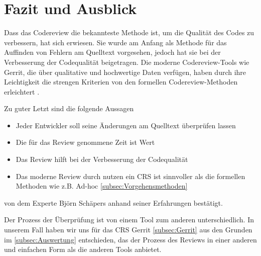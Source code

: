 \section{Fazit und Ausblick}

Dass das Codereview die bekannteste Methode ist, um die Qualität des Codes zu verbessern, hat sich erwiesen. Sie wurde am Anfang als Methode für das Auffinden von Fehlern am Quelltext vorgesehen, jedoch hat sie bei der Verbesserung der Codequalität beigetragen. Die moderne Codereview-Tools wie Gerrit, die über qualitative und hochwertige Daten verfügen, haben durch ihre Leichtigkeit die strengen Kriterien von den formellen Codereview-Methoden erleichtert \cite{mcintosh2016empirical}.

Zu guter Letzt sind die folgende Aussagen 

\begin{itemize}
	\item Jeder Entwickler soll seine Änderungen am Quelltext überprüfen lassen
	\item Die für das Review genommene Zeit ist Wert
	\item Das Review hilft bei der Verbesserung der Codequalität
	\item Das moderne Review durch nutzen ein \ac{CRS} ist sinnvoller als die formellen Methoden wie z.B. Ad-hoc \cref{subsec:Vorgehensmethoden}
\end{itemize}

von dem Experte Björn Schäpers \cite{Bjoern} anhand seiner Erfahrungen bestätigt.

Der Prozess der Überprüfung ist von einem Tool zum anderen unterschiedlich. In unserem Fall haben wir uns für das \ac{CRS} Gerrit \cref{subsec:Gerrit} aus den Grunden im \cref{subsec:Auswertung} entschieden, das der Prozess des Reviews in einer anderen und einfachen Form als die anderen Tools anbietet.

\label{seitenreinschrifft}
